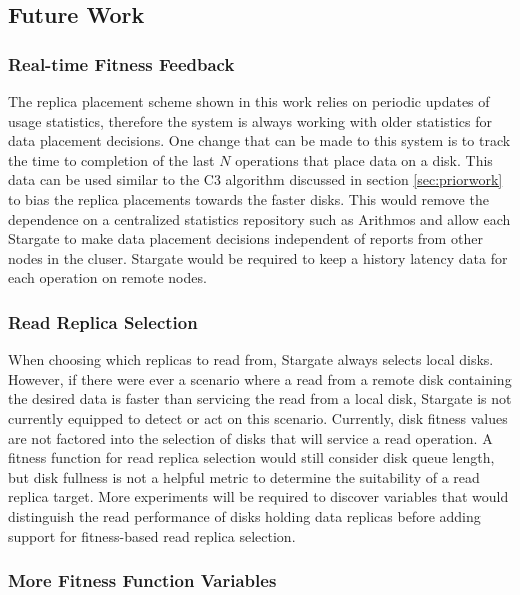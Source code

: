\documentclass[12pt]{article}
\begin{document}
  \subsection{Future Work}

    \subsubsection{Real-time Fitness Feedback}

    The replica placement scheme shown in this work relies on periodic updates
    of usage statistics, therefore the system is always working with older
    statistics for data placement decisions. One change that can be made to this
    system is to track the time to completion of the last $N$ operations that
    place data on a disk. This data can be used similar to the C3 algorithm
    discussed in section \ref{sec:priorwork} to bias the replica placements
    towards the faster disks. This would remove the dependence on a centralized
    statistics repository such as Arithmos and allow each Stargate to make data
    placement decisions independent of reports from other nodes in the cluser.
    Stargate would be required to keep a history latency data for each
    operation on remote nodes.

    \subsubsection{Read Replica Selection}

    When choosing which replicas to read from, Stargate always selects local
    disks. However, if there were ever a scenario where a read from a remote
    disk containing the desired data is faster than servicing the read from a
    local disk, Stargate is not currently equipped to detect or act on this
    scenario. Currently, disk fitness values are not factored into the selection
    of disks that will service a read operation. A fitness function for read
    replica selection would still consider disk queue length, but disk fullness
    is not a helpful metric to determine the suitability of a read replica
    target. More experiments will be required to discover variables that would
    distinguish the read performance of disks holding data replicas before
    adding support for fitness-based read replica selection.
    
    \subsubsection{More Fitness Function Variables}
\end{document}
